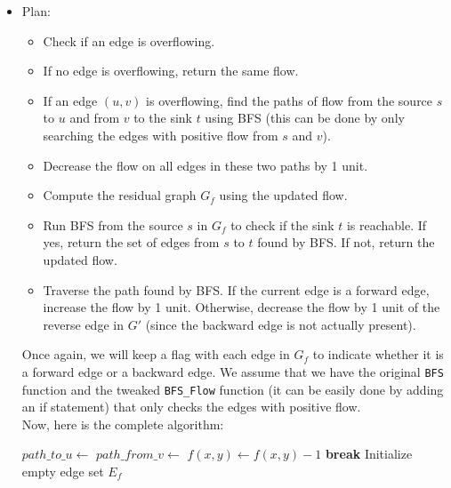\documentclass{article}
\begin{document}
\begin{itemize}
    \item[(b)] Plan:
    \begin{itemize}
      \item Check if an edge is overflowing.
      \item If no edge is overflowing, return the same flow.
      \item If an edge $(u, v)$ is overflowing, find the paths of flow from the source $s$ to $u$ and from $v$ to the sink $t$ using BFS (this can be done by only searching the edges with positive flow from $s$ and $v$).
      \item Decrease the flow on all edges in these two paths by 1 unit.
      \item Compute the residual graph $G_f$ using the updated flow.
      \item Run BFS from the source $s$ in $G_f$ to check if the sink $t$ is reachable.
      If yes, return the set of edges from $s$ to $t$ found by BFS.
      If not, return the updated flow.
      \item Traverse the path found by BFS.
      If the current edge is a forward edge, increase the flow by 1 unit.
      Otherwise, decrease the flow by 1 unit of the reverse edge in $G'$ (since the backward edge is not actually present).
    \end{itemize}
    Once again, we will keep a flag with each edge in $G_f$ to indicate whether it is a forward edge or a backward edge.
    We assume that we have the original \texttt{BFS} function and the tweaked \texttt{BFS\_Flow} function (it can be easily done by adding an if statement) that only checks the edges with positive flow. \\
    Now, here is the complete algorithm:
    \begin{algorithm}[H]
      \caption{Fix Flow}
      \begin{algorithmic}[1]
             
              \State $path\_to\_u \gets$ 
              \State $path\_from\_v \gets$ 
                \State $f(x, y) \gets f(x, y) - 1$
              \EndFor
              \State \textbf{break}
            \EndIf
          \EndFor
          \State Initialize empty edge set $E_f$
             

\end{algorithmic}
\end{algorithm}
\end{itemize}
\end{document}

